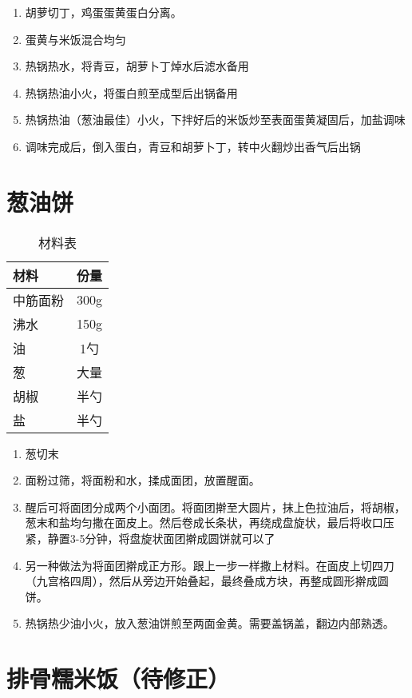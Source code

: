 \begin{enumerate}
    \item 胡萝切丁，鸡蛋蛋黄蛋白分离。
    \item 蛋黄与米饭混合均匀
    \item 热锅热水，将青豆，胡萝卜丁焯水后滤水备用
    \item 热锅热油小火，将蛋白煎至成型后出锅备用
    \item 热锅热油（葱油最佳）小火，下拌好后的米饭炒至表面蛋黄凝固后，加盐调味
    \item 调味完成后，倒入蛋白，青豆和胡萝卜丁，转中火翻炒出香气后出锅
\end{enumerate}


\section{葱油饼}

\begin{table}[H]
    \centering
    \begin{tabular}{|l||c|}\hline
     \textbf{材料}    &  \textbf{份量}\\ \hline\hline
    中筋面粉   &  300g \\ \hline
    沸水    & 150g  \\ \hline
    油 & 1勺 \\ \hline 
    葱 &  大量\\ \hline
    胡椒 & 半勺\\ \hline 
    盐 & 半勺\\ \hline 
    \end{tabular}
    \caption{材料表}
\end{table}

\begin{enumerate}
    \item 葱切末
    \item 面粉过筛，将面粉和水，揉成面团，放置醒面。
    \item 醒后可将面团分成两个小面团。将面团擀至大圆片，抹上色拉油后，将胡椒，葱末和盐均匀撒在面皮上。然后卷成长条状，再绕成盘旋状，最后将收口压紧，静置3-5分钟，将盘旋状面团擀成圆饼就可以了
    \item 另一种做法为将面团擀成正方形。跟上一步一样撒上材料。在面皮上切四刀（九宫格四周），然后从旁边开始叠起，最终叠成方块，再整成圆形擀成圆饼。
    \item 热锅热少油小火，放入葱油饼煎至两面金黄。需要盖锅盖，翻边内部熟透。
\end{enumerate}


\section{排骨糯米饭（待修正）}


